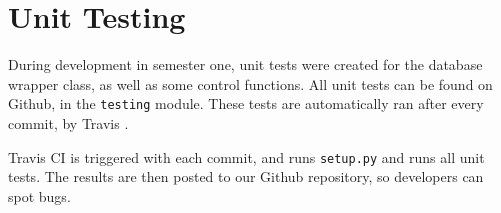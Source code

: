 \section{Unit Testing}
\label{sec:unit-testing}
\pagestyle{cameron}

During development in semester one, unit tests were created for the database wrapper class, as well as some control functions. All unit tests can be found on Github, in the \texttt{testing} module. These tests are automatically ran after every commit, by Travis .

Travis \gls{CI} is triggered with each commit, and runs \texttt{setup.py} and runs all unit tests. The results are then posted to our Github repository, so developers can spot bugs.

